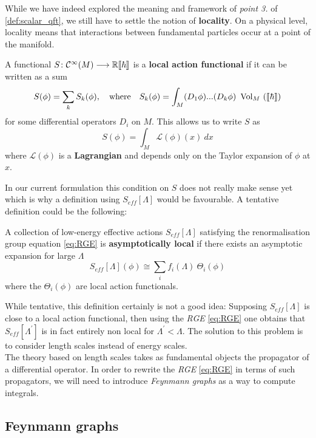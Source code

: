 While we have indeed explored the meaning and framework of \emph{point 3.} of \ref{def:scalar_qft}, we still have to settle the notion of \textbf{locality}. On a physical level, locality means that interactions between fundamental particles occur at a point of the manifold.

\begin{definition}
  A functional $S\colon \mathcal{C}^{\infty}(M) \longrightarrow \mathbb{R} \llbracket \hbar \rrbracket$ is a \textbf{local action functional} if it can be written as a sum
  $$ S(\phi) = \sum_k S_k (\phi), \quad \text{where} \quad S_k(\phi) = \int_M (D_1 \phi) ... (D_k \phi) \ \vol_M \ ( \llbracket \hbar \rrbracket)$$
  for some differential operators $D_i$ on $M$. This allows us to write $S$ as
  $$ S(\phi) = \int_M \mathcal{L}(\phi)(x) \ dx $$
  where $\mathcal{L}(\phi)$ is a \textbf{Lagrangian} and depends only on the Taylor expansion of $\phi$ at $x$.
\end{definition}

In our current formulation this condition on $S$ does not really make sense yet which is why a definition using $S_{eff}[\Lambda]$ would be favourable. A tentative definition could be the following:

\begin{definition}
  A collection of low-energy effective actions $S_{eff}[\Lambda]$ satisfying the renormalisation group equation \ref{eq:RGE} is \textbf{asymptotically local} if there exists an asymptotic expansion for large $\Lambda$
  $$ S_{eff}[\Lambda] (\phi) \cong \sum_i f_i (\Lambda) \ \Theta_i (\phi) $$
  where the $\Theta_i (\phi)$ are local action functionals.
\end{definition}

While tentative, this definition certainly is not a good idea: Supposing $S_{eff}[\Lambda]$ is close to a local action functional, then using the \emph{RGE} \ref{eq:RGE} one obtains that $S_{eff}[\Lambda^\prime]$ is in fact entirely non local for $\Lambda^\prime < \Lambda$. The solution to this problem is to consider length scales instead of energy scales.\\

The theory based on length scales takes as fundamental objects the propagator of a differential operator. In order to rewrite the \emph{RGE} \ref{eq:RGE} in terms of such propagators, we will need to introduce \emph{Feynmann graphs} as a way to compute integrals.

\subsection{Feynmann graphs}
\label{subsec:feynmann_graphs}

